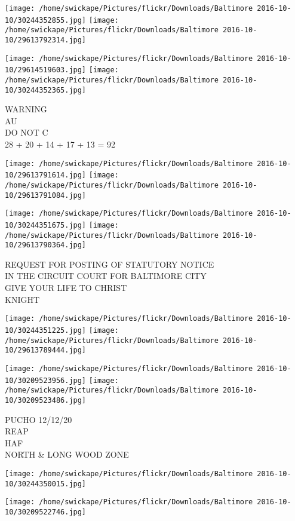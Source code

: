 \documentclass[10pt,letterpaper]{article}
\begin{document}
\texttt{[image: /home/swickape/Pictures/flickr/Downloads/Baltimore 2016-10-10/30244352855.jpg]}
\texttt{[image: /home/swickape/Pictures/flickr/Downloads/Baltimore 2016-10-10/29613792314.jpg]}

\texttt{[image: /home/swickape/Pictures/flickr/Downloads/Baltimore 2016-10-10/29614519603.jpg]}
\texttt{[image: /home/swickape/Pictures/flickr/Downloads/Baltimore 2016-10-10/30244352365.jpg]}

WARNING\\
AU\\
DO NOT C\\
28 + 20 + 14 + 17 + 13 = 92
\pagebreak

\texttt{[image: /home/swickape/Pictures/flickr/Downloads/Baltimore 2016-10-10/29613791614.jpg]}
\texttt{[image: /home/swickape/Pictures/flickr/Downloads/Baltimore 2016-10-10/29613791084.jpg]}

\texttt{[image: /home/swickape/Pictures/flickr/Downloads/Baltimore 2016-10-10/30244351675.jpg]}
\texttt{[image: /home/swickape/Pictures/flickr/Downloads/Baltimore 2016-10-10/29613790364.jpg]}

REQUEST FOR POSTING OF STATUTORY NOTICE\\
IN THE CIRCUIT COURT FOR BALTIMORE CITY\\
GIVE YOUR LIFE TO CHRIST\\
KNIGHT
\pagebreak

\texttt{[image: /home/swickape/Pictures/flickr/Downloads/Baltimore 2016-10-10/30244351225.jpg]}
\texttt{[image: /home/swickape/Pictures/flickr/Downloads/Baltimore 2016-10-10/29613789444.jpg]}

\texttt{[image: /home/swickape/Pictures/flickr/Downloads/Baltimore 2016-10-10/30209523956.jpg]}
\texttt{[image: /home/swickape/Pictures/flickr/Downloads/Baltimore 2016-10-10/30209523486.jpg]}

PUCHO 12/12/20\\
REAP\\
HAF\\
NORTH \& LONG WOOD ZONE
\pagebreak

\texttt{[image: /home/swickape/Pictures/flickr/Downloads/Baltimore 2016-10-10/30244350015.jpg]}

\vspace{0.25in}
\texttt{[image: /home/swickape/Pictures/flickr/Downloads/Baltimore 2016-10-10/30209522746.jpg]}
\end{document}
